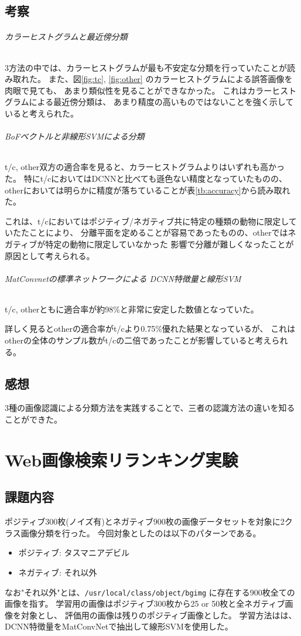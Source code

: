 \documentclass[11pt,a4paper, uplatex]{jsreport}
\begin{document}
\section{考察}
\subparagraph{カラーヒストグラムと最近傍分類}
3方法の中では、カラーヒストグラムが最も不安定な分類を行っていたことが読み取れた。
また、図\ref{fig:tc}, \ref{fig:other}
のカラーヒストグラムによる誤答画像を肉眼で見ても、
あまり類似性を見ることができなかった。
これはカラーヒストグラムによる最近傍分類は、
あまり精度の高いものではないことを強く示していると考えられた。

\subparagraph{BoFベクトルと非線形SVMによる分類}
t/c, other双方の適合率を見ると、カラーヒストグラムよりはいずれも高かった。
特にt/cにおいてはDCNNと比べても遜色ない精度となっていたものの、
otherにおいては明らかに精度が落ちていることが表\ref{tb:accuracy}から読み取れた。

これは、t/cにおいてはポジティブ/ネガティブ共に特定の種類の動物に限定していたたことにより、
分離平面を定めることが容易であったものの、otherではネガティブが特定の動物に限定していなかった
影響で分離が難しくなったことが原因として考えられる。

\subparagraph{MatConvnetの標準ネットワークによる DCNN特徴量と線形SVM}
t/c, otherともに適合率が約98\%と非常に安定した数値となっていた。

詳しく見るとotherの適合率がt/cより0.75\%優れた結果となっているが、
これはotherの全体のサンプル数がt/cの二倍であったことが影響していると考えられる。
\section{感想}
3種の画像認識による分類方法を実践することで、三者の認識方法の違いを知ることができた。
\chapter{Web画像検索リランキング実験}
\section{課題内容}
ポジティブ300枚(ノイズ有)とネガティブ900枚の画像データセットを対象に2クラス画像分類を行った。
今回対象としたのは以下のパターンである。
\begin{itemize}
  \item ポジティブ: タスマニアデビル
  \item ネガティブ: それ以外
\end{itemize}
なお"それ以外"とは、\texttt{/usr/local/class/object/bgimg}
に存在する900枚全ての画像を指す。
学習用の画像はポジティブ300枚から25 or 50枚と全ネガティブ画像を対象とし、
評価用の画像は残りのポジティブ画像とした。
学習方法はは、DCNN特徴量をMatConvNetで抽出して線形SVMを使用した。
\end{document}
